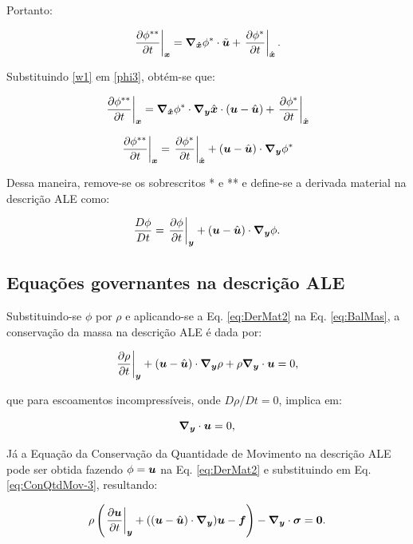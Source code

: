 \noindent Portanto:

\begin{equation}
    \dTimex{\phi^{**}}=\Nxh\phi^{*}\cdot\tilde{\BB{u}}+\dTimexh{\phi^{*}}\text{.}
    \label{phi3}
\end{equation}

Substituindo \ref{w1} em \ref{phi3}, obtém-se que:

\[\left.\frac{\partial \phi^{**}}{\partial t}\right|_{\boldsymbol{x}}=\boldsymbol{\nabla_{\hat{x}}}\phi^{*}\cdot\boldsymbol{\nabla_y}\hat{\boldsymbol{x}}\cdot(\boldsymbol{u}-\hat{\boldsymbol{u}})+\left.\frac{\partial \phi^{*}}{\partial t}\right|_{\hat{\boldsymbol{x}}}\]

\[\left.\frac{\partial \phi^{**}}{\partial t}\right|_{\boldsymbol{x}}=\left.\frac{\partial \phi^{*}}{\partial t}\right|_{\hat{\boldsymbol{x}}}+(\boldsymbol{u}-\hat{\boldsymbol{u}})\cdot\boldsymbol{\nabla_y}\phi^{*}\]

Dessa maneira, remove-se os sobrescritos * e ** e define-se a derivada material na descrição ALE como:

\begin{equation}
    \frac{D\phi}{Dt}=\dTime{\phi}+(\BB{u}-\uhat)\cdot\Ny\phi\text{.}
    \label{eq:DerMat2}
\end{equation}

\subsection{Equações governantes na descrição ALE}

Substituindo-se $\phi$ por $\rho$ e aplicando-se a Eq. \eqref{eq:DerMat2} na Eq. \eqref{eq:BalMas}, a conservação da massa na descrição ALE é dada por:

\begin{equation}
    \left.\frac{\partial \rho}{\partial t}\right|_{\boldsymbol{y}}+(\boldsymbol{u}-\hat{\boldsymbol{u}})\cdot\boldsymbol{\nabla_y}\rho+\rho\boldsymbol{\nabla_y}\cdot\boldsymbol{u}=0\text{,}
\end{equation}

\noindent que para escoamentos incompressíveis, onde $D\rho/Dt=0$, implica em:

\begin{equation}
    \Ny\cdot\BB{u}=0\text{,}
    \label{eq:ALE-cont}
\end{equation}

Já a Equação da Conservação da Quantidade de Movimento na descrição ALE pode ser obtida fazendo $\mathbf{\phi}=\boldsymbol{u}$ na Eq. \eqref{eq:DerMat2} e substituindo em Eq. \eqref{eq:ConQtdMov-3}, resultando:

\begin{equation}
    \rho\bigpar{\dTime{\BB{u}}+((\BB{u}-\uhat)\cdot\Ny)\BB{u}-\BB{f}}-\Ny\cdot\tens=\BB{0}\text{.}
    \label{eq:ALE-mov}
\end{equation}

